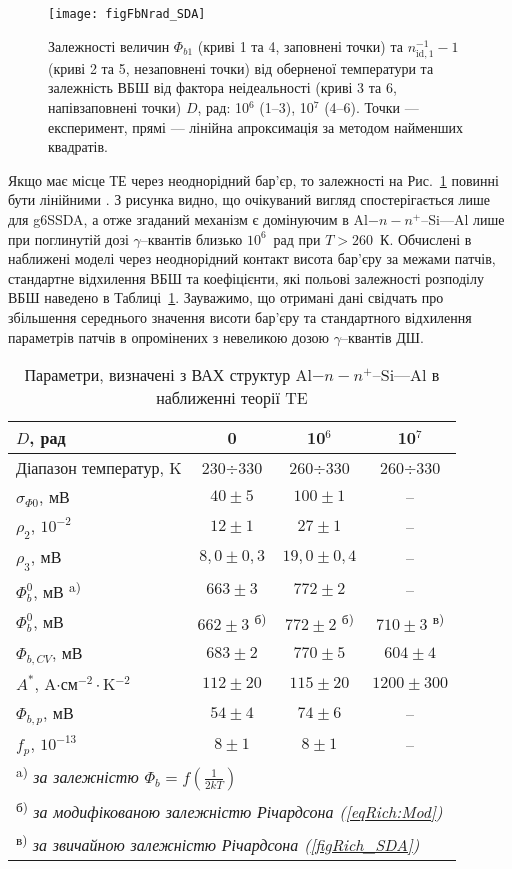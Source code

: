 \begin{figure}
\center
\texttt{[image: figFbNrad\_SDA]}
\caption{\label{figFbNrad_SDA}
Залежності величин $\Phi_{b1}$ (криві 1 та 4, заповнені точки) та
$n_{\mathrm{id},1}^{-1}-1$ (криві 2 та 5, незаповнені точки) від оберненої температури
та залежність ВБШ від фактора неідеальності (криві 3 та 6, напівзаповнені точки)
$D$, рад: 10$^6$ (1--3), 10$^7$ (4--6).
Точки --- експеримент,
прямі --- лінійна апроксимація за методом найменших квадратів.
}%
\end{figure}

Якщо має місце ТЕ через неоднорідний бар'єр, то залежності на Рис.~\ref{figFbNrad_SDA} повинні бути лінійними \cite{Werner,Tung:PhysRev,Schmitsdorf}.
З рисунка видно, що очікуваний вигляд спостерігається лише для g6SSDA,
а отже згаданий механізм є домінуючим в Al$-n-n^+$--Si---Al лише при поглинутій дозі $\gamma$--квантів близько $10^6$~рад при $T>260$~К.
Обчислені в наближені моделі через неоднорідний контакт висота бар'єру за межами патчів,
стандартне відхилення ВБШ та коефіцієнти, які польові залежності розподілу ВБШ наведено в Таблиці~\ref{tabSDAParRad}.
Зауважимо, що отримані дані свідчать про збільшення середнього значення висоти бар'єру та
стандартного відхилення параметрів патчів в опромінених з невеликою дозою $\gamma$--квантів ДШ.

\begin{table}
\caption{Параметри, визначені з ВАХ структур Al$-n-n^+$--Si---Al в наближенні теорії TE}
\label{tabSDAParRad}
\centering
\begin{tabular}{|l|c|c|c|}
\hline
$D$, рад & 0&10$^6$&10$^7$\\ \hline
Діапазон температур, K&230$\div$330&260$\div$330&260$\div$330\\ \hline
$\sigma_{\Phi0}$, мВ&$40\pm5$&$100\pm1$&--\\ \hline
$\rho_2$, $10^{-2}$&$12\pm1$&$27\pm1$&--\\ \hline
$\rho_3$, мВ&$8,0\pm0,3$&$19,0\pm0,4$&--\\ \hline
$\Phi_b^0$, мВ \textsuperscript{ a)}&$663\pm3$&$772\pm2$&--\\ \hline
$\Phi_b^0$, мВ &$662\pm3$ \textsuperscript{ б)}&$772\pm2$ \textsuperscript{ б)}&$710\pm3$ \textsuperscript{ в)}\\ \hline
$\Phi_{b,CV}$, мВ &$683\pm2$&$770\pm5$&$604\pm4$\\ \hline
$A^*$, A$\cdot$см$^{-2}\cdot$K$^{-2}$&$112\pm20$&$115\pm20$&$1200\pm300$\\
\hline
$\Phi_{b,p}$, мВ&$54\pm4$&$74\pm6$&--\\ \hline
$f_p$, $10^{-13}$&$8\pm1$&$8\pm1$&--\\ \hline
\multicolumn{4}{l}{\textsuperscript{ a)} \emph{за залежністю $\Phi_b=f(\frac{1}{2kT})$}} \\
\multicolumn{4}{l}{\textsuperscript{ б)} \emph{за модифікованою залежністю Річардсона (\ref{eqRich:Mod}) }} \\
\multicolumn{4}{l}{\textsuperscript{ в)} \emph{за звичайною залежністю Річардсона (\ref{figRich_SDA})}} \\
\end{tabular}
\end{table}


